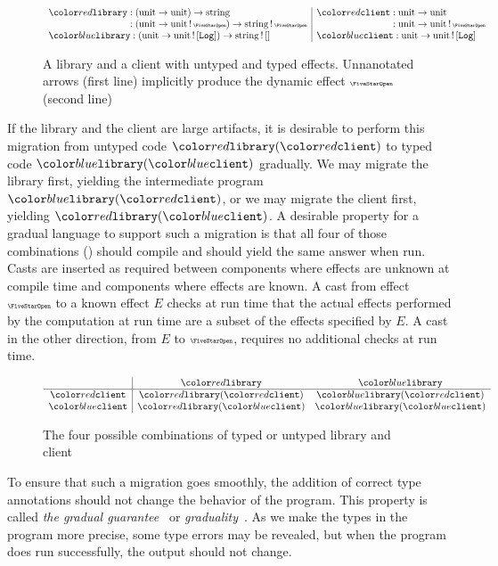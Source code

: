 \begin{figure}[H]
$$
\begin{array}{l|l}
  \dhandler : (\tyunit \to \tyunit) \to \tystring & \dclient : \tyunit \to \tyunit \\
  \hphantom{\dhandler} : (\tyunit \to \tyunit\,!\,\effany) \to \tystring\,!\,\effany & \hphantom{\dclient} : \tyunit \to \tyunit\,!\,\effany \\
  \shandler : (\tyunit \to \tyunit\,!\,\eflog) \to \tystring \,!\, \efnone & \sclient : \tyunit \to \tyunit\,!\,\eflog
\end{array}
$$
  \caption{A library and a client with {\color{red}untyped} and {\color{blue}typed} effects. Unnanotated arrows (first line) implicitly produce the dynamic effect $\effany$ (second line)}
\label{fig:app-example}
\end{figure}

If the library and the client are large artifacts, it is desirable to
perform this migration from untyped code $\dhandler(\dclient)$ to typed code $\shandler(\sclient)$ gradually.
We may migrate the library first, yielding the intermediate program $\shandler(\dclient)$,
or we may migrate the client first, yielding $\dhandler(\sclient)$.
A desirable property for a gradual language to support such a migration is that all
four of those combinations ()
should compile and should yield the same answer when run.
Casts are inserted as required between components where effects are unknown at compile time
and components where effects are known. A cast from effect $\effany$ to a known effect $E$
checks at run time that the actual effects performed by the computation at run time are
a subset of the effects specified by $E$. A cast in the other direction,
from $E$ to $\effany$, requires no additional checks at run time.

\begin{figure}[H]
$$
\begin{array}{c|cc}
  & \dhandler & \shandler \\
  \hline
  \dclient & \dhandler(\dclient) & \shandler(\dclient) \\
  \sclient & \dhandler(\sclient) & \shandler(\sclient)
\end{array}
$$
\caption{The four possible combinations of typed or untyped library and client}
\label{fig:migration-example}
\end{figure}

To ensure that such a migration goes smoothly, the addition of correct type annotations
should not change the behavior of the program. This property
is called \emph{the gradual guarantee}~\citep{siek2015} or \emph{graduality}~\citep{new-ahmed-2018}.
As we make the types in the program more precise, some type errors may be
revealed, but when the program does run successfully, the output
should not change.

